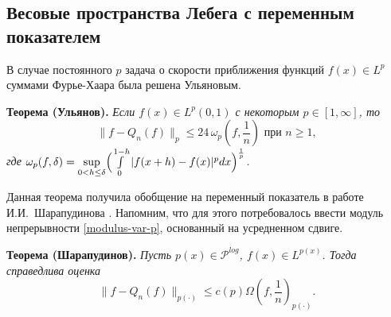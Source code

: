 \subsection{Весовые пространства Лебега с переменным показателем}
В случае постоянного $p$ задача о скорости приближения функций $f(x) \in L^p$ суммами Фурье-Хаара была решена Ульяновым.

\textbf{Теорема (Ульянов).}
\textit{
Если $f(x) \in L^p(0,1)$ с некоторым $p\in [1,\infty]$, то
\begin{equation*}
  \|f-Q_n(f)\|_p \le 24\,\omega_p(f,\frac{1}{n}) \textrm{ при } n \ge 1,
\end{equation*}
где $\omega_p(f,\delta) = \sup\limits_{0 < h \le \delta} \Bigl( \int\limits_0^{1-h}|f(x+h)-f(x)|^p dx \Bigr)^{\frac{1}{p}}$.
}

Данная теорема получила обобщение на переменный показатель в работе И.И.~Шарапудинова \cite{shii-haarspeed}. Напомним, что для этого потребовалось ввести модуль непрерывности \eqref{modulus-var-p}, основанный на усредненном сдвиге.

\textbf{Теорема (Шарапудинов).}
\textit{
Пусть $p(x) \in \mathcal{P}^{log}$, $f(x) \in L^{p(x)}$. Тогда справедлива оценка
\begin{equation*}
  \|f-Q_n(f)\|_{p(\cdot)} \le c(p) \Omega(f,\frac{1}{n})_{p(\cdot)}.
\end{equation*}
}

